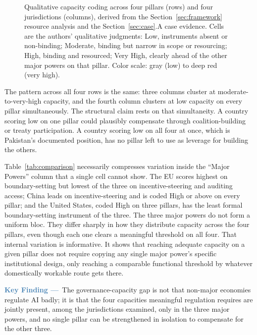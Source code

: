 \documentclass[journal]{IEEEtran}
\begin{document}
\begin{figure}[!t]
{%
}
\caption{Qualitative capacity coding across four pillars (rows) and four jurisdictions (columns), derived from the Section~\ref{sec:framework} resource analysis and the Section~\ref{sec:case}.A case evidence. Cells are the authors' qualitative judgments: Low, instruments absent or non-binding; Moderate, binding but narrow in scope or resourcing; High, binding and resourced; Very High, clearly ahead of the other major powers on that pillar. Color scale: gray (low) to deep red (very high).}
\label{fig:heatmap}
\end{figure}

The pattern across all four rows is the same: three columns cluster at moderate-to-very-high capacity, and the fourth column clusters at low capacity on every pillar simultaneously. The structural claim rests on that simultaneity. A country scoring low on one pillar could plausibly compensate through coalition-building or treaty participation. A country scoring low on all four at once, which is Pakistan's documented position, has no pillar left to use as leverage for building the others.

Table~\ref{tab:comparison} necessarily compresses variation inside the ``Major Powers'' column that a single cell cannot show. The EU scores highest on boundary-setting but lowest of the three on incentive-steering and auditing access; China leads on incentive-steering and is coded High or above on every pillar; and the United States, coded High on three pillars, has the least formal boundary-setting instrument of the three. The three major powers do not form a uniform bloc. They differ sharply in how they distribute capacity across the four pillars, even though each one clears a meaningful threshold on all four. That internal variation is informative. It shows that reaching adequate capacity on a given pillar does not require copying any single major power's specific institutional design, only reaching a comparable functional threshold by whatever domestically workable route gets there.

\begin{mdframed}[linecolor=steelblue, linewidth=1.2pt, backgroundcolor=steelblue!6,
  innerleftmargin=8pt, innerrightmargin=8pt, innertopmargin=6pt, innerbottommargin=6pt,
  roundcorner=4pt]
\noindent\textcolor{steelblue}{\bfseries Key Finding ---}~The governance-capacity gap is not that non-major economies regulate AI badly; it is that the four capacities meaningful regulation requires are jointly present, among the jurisdictions examined, only in the three major powers, and no single pillar can be strengthened in isolation to compensate for the other three.
\end{mdframed}
\end{document}
